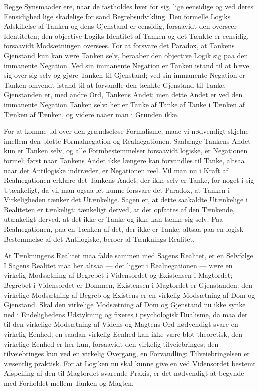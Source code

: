 \documentclass[12pt]{book}
\newcommand{\opage}[1]{\marginnote{\footnotesize\textit{[#1]}}}
\begin{document}
Begge Synsmaader ere, naar de fastholdes hver for sig,
lige eensidige og ved deres Eensidighed lige skadelige for
sand Begrebsudvikling. Den formelle Logiks Adskillelse af
Tanken og dens Gjenstand er eensidig, forsaavidt den overseer
Identiteten; den objective Logiks Identitet af Tanken og det
Tænkte er eensidig, forsaavidt Modsætningen oversees. For
at forsvare det Paradox, at Tankens Gjenstand kun kan være
Tanken selv, beraaber den objective Logik sig paa den immanente
Negation. Ved sin immanente Negation er Tanken istand til
\opage{120}at hæve sig over sig selv og gjøre Tanken til Gjenstand; ved
sin immanente Negation er Tanken omvendt istand til at
forvandle den tænkte Gjenstand til Tanke. Gjenstanden er,
med andre Ord, Tankens Andet; men dette Andet er ved den
immanente Negation Tanken selv: her er Tanke af Tanke af
Tanke i Tænken af Tænken af Tænken, og videre naaer man
i Grunden ikke.

For at komme ud over den grændseløse Formalisme,
maae vi nødvendigt skjelne imellem den blotte Formalnegation
og Realnegationen. Saalænge Tankens Andet kun er Tanken
selv, og alle Formbestemmelser forsaavidt logiske, er Negationen
formel; først naar Tankens Andet ikke længere kan forvandles
til Tanke, altsaa naar det Antilogiske indtræder, er Negationen
reel. Vil man nu i Kraft af Realnegationen erklære det
Tankens Andet, der ikke selv er Tanke, for noget i sig Utænkeligt,
da vil man ogsaa let kunne forsvare det Paradox, at
Tanken i Virkeligheden tænker det Utænkelige. Sagen er, at
dette saakaldte Utænkelige i Realiteten er tænkeligt: tænkeligt
derved, at det opfattes af den Tænkende, utænkeligt derved, at
det ikke er Tanke og ikke kan tænke sig selv. Paa Realnegationen,
paa en Tænken af det, der ikke er Tanke, altsaa paa
en logisk Bestemmelse af det Antilogiske, beroer al Tænknings
Realitet.

At Tænkningens Realitet maa falde sammen med Sagens
Realitet, er en Selvfølge. I Sagens Realitet maa her altsaa
--- det ligger i Realnegationen --- være en virkelig Modsætning
af Begrebet i Vidensordet og Existensen i Magtordet;
Begrebet i Vidensordet er Dommen, Existensen i Magtordet
er Gjenstanden: den virkelige Modsætning af Begreb og
Existens er en virkelig Modsætning af Dom og Gjenstand.
Skal den virkelige Modsætning af Dom og Gjenstand nu
ikke synke ned i Endelighedens Udstykning og fixeres i psychologisk
Dualisme, da maa der til den virkelige Modsætning af
Videns og Magtens Ord nødvendigt svare en virkelig Eenhed;
\opage{121}en saadan virkelig Eenhed kan ikke være blot theoretisk, den
virkelige Eenhed er her kun, forsaavidt den virkelig tilveiebringes;
den tilveiebringes kun ved en virkelig Overgang, en
Forvandling: Tilveiebringelsen er væsentlig praktisk. For at
Logiken nu skal kunne give en ved Vidensordet bestemt Afspeiling
af den til Magtordet svarende Praxis, er det nødvendigt
at begynde med Forholdet mellem Tanken og Magten.
\end{document}
